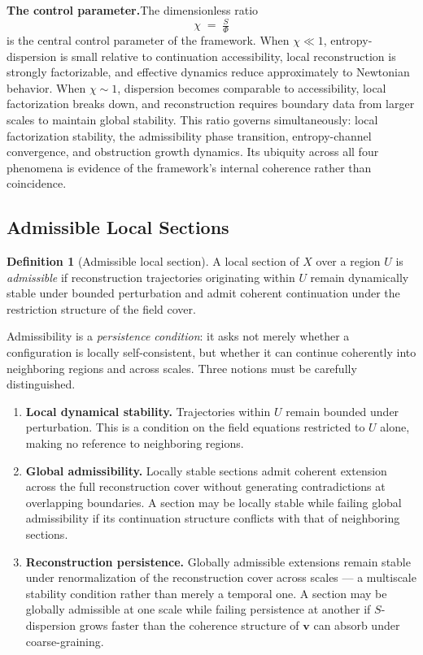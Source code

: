 \documentclass[11pt, a4paper]{article}
\theoremstyle{plain}
\theoremstyle{definition}
\newtheorem{definition}[theorem]{Definition}
\theoremstyle{remark}
\newcommand{\ctrl}{\tfrac{S}{\Phi}}
\begin{document}
\medskip
\noindent\textbf{The control parameter.}\quad The dimensionless ratio
\begin{equation}
  \label{eq:control}
  \chi \;=\; \ctrl
\end{equation}
is the central control parameter of the framework. When $\chi \ll 1$,
entropy-dispersion is small relative to continuation accessibility, local
reconstruction is strongly factorizable, and effective dynamics reduce approximately
to Newtonian behavior. When $\chi \sim 1$, dispersion becomes comparable to
accessibility, local factorization breaks down, and reconstruction requires boundary
data from larger scales to maintain global stability. This ratio governs
simultaneously: local factorization stability, the admissibility phase transition,
entropy-channel convergence, and obstruction growth dynamics. Its ubiquity across all
four phenomena is evidence of the framework's internal coherence rather than
coincidence.

\subsection{Admissible Local Sections}

\begin{definition}[Admissible local section]
\label{def:admissible}
A local section of $X$ over a region $U$ is \emph{admissible} if reconstruction
trajectories originating within $U$ remain dynamically stable under bounded
perturbation and admit coherent continuation under the restriction structure of the
field cover.
\end{definition}

Admissibility is a \emph{persistence condition}: it asks not merely whether a
configuration is locally self-consistent, but whether it can continue coherently into
neighboring regions and across scales. Three notions must be carefully distinguished.

\begin{enumerate}[label=(\roman*)]
  \item \textbf{Local dynamical stability.} Trajectories within $U$ remain bounded
    under perturbation. This is a condition on the field equations restricted to $U$
    alone, making no reference to neighboring regions.

  \item \textbf{Global admissibility.} Locally stable sections admit coherent
    extension across the full reconstruction cover without generating contradictions
    at overlapping boundaries. A section may be locally stable while failing global
    admissibility if its continuation structure conflicts with that of neighboring
    sections.

  \item \textbf{Reconstruction persistence.} Globally admissible extensions remain
    stable under renormalization of the reconstruction cover across scales --- a
    multiscale stability condition rather than merely a temporal one. A section may
    be globally admissible at one scale while failing persistence at another if
    $S$-dispersion grows faster than the coherence structure of $\mathbf{v}$ can
    absorb under coarse-graining.
\end{enumerate}
\end{document}
